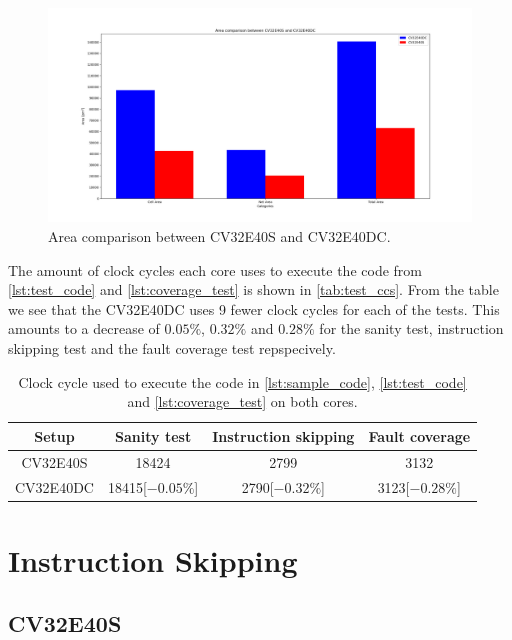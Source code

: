 \begin{figure}[h!]
    \centering
    \includegraphics[width=\textwidth]{docs/images/area_comparison.png}
    \caption{Area comparison between CV32E40S and CV32E40DC.}
    \label{fig:area_compare}
\end{figure}

The amount of clock cycles each core uses to execute the code from \autoref{lst:test_code} and \autoref{lst:coverage_test} is shown in \autoref{tab:test_ccs}. From the table we see that the CV32E40DC uses 9 fewer clock cycles for each of the tests. This amounts to a decrease of $0.05\%$, $0.32\%$ and $0.28\%$ for the sanity test, instruction skipping test and the fault coverage test repspecively. 

\begin{table}[h]
\centering
\caption{Clock cycle used to execute the code in \autoref{lst:sample_code}, \autoref{lst:test_code} and \autoref{lst:coverage_test} on both cores.}
\label{tab:test_ccs}
\begin{tabular}{c|ccc}
\toprule 
Setup & Sanity test & Instruction skipping & Fault coverage \\
\midrule
\rowcolor{black!20} CV32E40S & 18424 & 2799 & 3132\\
CV32E40DC & 18415[$-0.05\%$] & 2790[$-0.32\%$] & 3123[$-0.28\%$]\\
\bottomrule
\end{tabular}
\end{table}

\section{Instruction Skipping}
\label{sec:instr_skip_result}

\subsection{CV32E40S}
\label{subsec:single_instr_skip}

